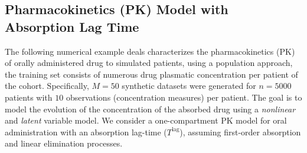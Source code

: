 \documentclass[12pt]{article}
\begin{document}
\subsection{Pharmacokinetics (PK) Model with Absorption Lag Time}
The following numerical example deals characterizes the pharmacokinetics (PK) of orally administered drug to simulated patients, using a population approach, \ie the training set consists of numerous drug plasmatic concentration per patient of the cohort. 
Specifically, $M = 50$ synthetic datasets were generated for $n = 5000$ patients with $10$ observations (concentration measures) per patient.
The goal is to model the evolution of the concentration of the absorbed drug using a \emph{nonlinear} and \emph{latent} variable model. 
We consider a one-compartment PK model for oral administration with an absorption lag-time ($T^{\textrm{lag}}$), assuming first-order absorption and linear elimination processes.
\end{document}
